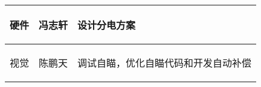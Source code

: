 \begin{longtable}{ p{2cm} | p{3.5cm} | p{9.3cm} |}
    \hline

        \begin{center}
            硬件
        \end{center}&
        \begin{center}
            冯志轩
        \end{center}&
        \begin{center}
            设计分电方案
        \end{center}\\
        
    \hline
    
        \begin{center}
            视觉
        \end{center}&
        \begin{center}
            陈鹏天
        \end{center}&
        \begin{center}
            调试自瞄，优化自瞄代码和开发自动补偿
        \end{center}\\

    \hline
    
\end{longtable}
